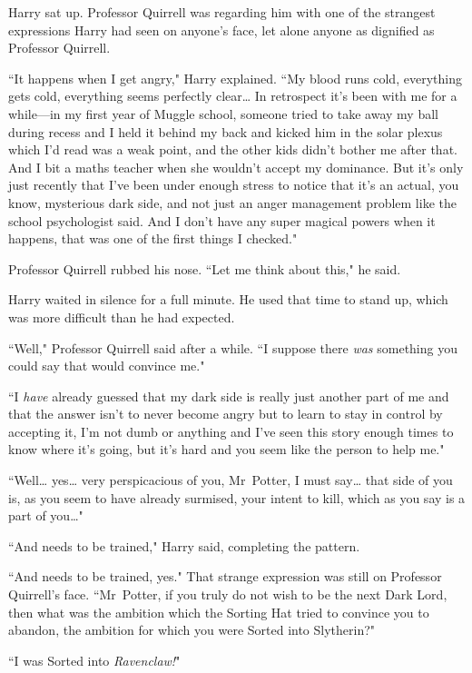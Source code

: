Harry sat up. Professor Quirrell was regarding him with one of the strangest expressions Harry had seen on anyone's face, let alone anyone as dignified as Professor Quirrell.

``It happens when I get angry," Harry explained. ``My blood runs cold, everything gets cold, everything seems perfectly clear{\ldots} In retrospect it's been with me for a while—in my first year of Muggle school, someone tried to take away my ball during recess and I held it behind my back and kicked him in the solar plexus which I'd read was a weak point, and the other kids didn't bother me after that. And I bit a maths teacher when she wouldn't accept my dominance. But it's only just recently that I've been under enough stress to notice that it's an actual, you know, mysterious dark side, and not just an anger management problem like the school psychologist said. And I don't have any super magical powers when it happens, that was one of the first things I checked."

Professor Quirrell rubbed his nose. ``Let me think about this," he said.

Harry waited in silence for a full minute. He used that time to stand up, which was more difficult than he had expected.

``Well," Professor Quirrell said after a while. ``I suppose there \emph{was} something you could say that would convince me."

``I \emph{have} already guessed that my dark side is really just another part of me and that the answer isn't to never become angry but to learn to stay in control by accepting it, I'm not dumb or anything and I've seen this story enough times to know where it's going, but it's hard and you seem like the person to help me."

``Well{\ldots} yes{\ldots} very perspicacious of you, Mr~Potter, I must say{\ldots} that side of you is, as you seem to have already surmised, your intent to kill, which as you say is a part of you{\ldots}"

``And needs to be trained," Harry said, completing the pattern.

``And needs to be trained, yes." That strange expression was still on Professor Quirrell's face. ``Mr~Potter, if you truly do not wish to be the next Dark Lord, then what was the ambition which the Sorting Hat tried to convince you to abandon, the ambition for which you were Sorted into Slytherin?"

``I was Sorted into \emph{Ravenclaw!}"

